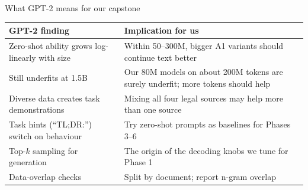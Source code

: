 \documentclass[aspectratio=169,11pt]{beamer}
\begin{document}
\begin{frame}{What GPT-2 means for our capstone}
  \small
  \begin{tabularx}{\textwidth}{@{}lX@{}}
    \toprule
    GPT-2 finding & Implication for us\\
    \midrule
    Zero-shot ability grows log-linearly with size & Within 50--300M, bigger A1 variants should continue text better\\
    Still underfits at 1.5B & Our 80M models on about 200M tokens are surely underfit; more tokens should help\\
    Diverse data creates task demonstrations & Mixing all four legal sources may help more than one source\\
    Task hints (``TL;DR:'') switch on behaviour & Try zero-shot prompts as baselines for Phases 3--6\\
    Top-$k$ sampling for generation & The origin of the decoding knobs we tune for Phase 1\\
    Data-overlap checks & Split by document; report n-gram overlap\\
    \bottomrule
  \end{tabularx}
\end{frame}
\end{document}
